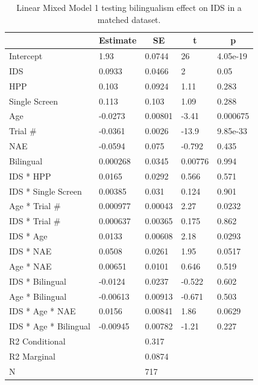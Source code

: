\documentclass[,man,floatsintext]{apa6}
\begin{document}
\begin{table}[tbp]
\begin{center}
\begin{threeparttable}
\caption{\label{tab:unnamed-chunk-10}Linear Mixed Model 1 testing bilingualism effect on IDS in a matched dataset.}
\begin{tabular}{lllll}
\toprule
 & \multicolumn{1}{c}{Estimate} & \multicolumn{1}{c}{SE} & \multicolumn{1}{c}{t} & \multicolumn{1}{c}{p}\\
\midrule
Intercept & 1.93 & 0.0744 & 26 & 4.05e-19\\
IDS & 0.0933 & 0.0466 & 2 & 0.05\\
HPP & 0.103 & 0.0924 & 1.11 & 0.283\\
Single Screen & 0.113 & 0.103 & 1.09 & 0.288\\
Age & -0.0273 & 0.00801 & -3.41 & 0.000675\\
Trial \# & -0.0361 & 0.0026 & -13.9 & 9.85e-33\\
NAE & -0.0594 & 0.075 & -0.792 & 0.435\\
Bilingual & 0.000268 & 0.0345 & 0.00776 & 0.994\\
IDS * HPP & 0.0165 & 0.0292 & 0.566 & 0.571\\
IDS * Single Screen & 0.00385 & 0.031 & 0.124 & 0.901\\
Age * Trial \# & 0.000977 & 0.00043 & 2.27 & 0.0232\\
IDS * Trial \# & 0.000637 & 0.00365 & 0.175 & 0.862\\
IDS * Age & 0.0133 & 0.00608 & 2.18 & 0.0293\\
IDS * NAE & 0.0508 & 0.0261 & 1.95 & 0.0517\\
Age * NAE & 0.00651 & 0.0101 & 0.646 & 0.519\\
IDS * Bilingual & -0.0124 & 0.0237 & -0.522 & 0.602\\
Age * Bilingual & -0.00613 & 0.00913 & -0.671 & 0.503\\
IDS * Age * NAE & 0.0156 & 0.00841 & 1.86 & 0.0629\\
IDS * Age * Bilingual & -0.00945 & 0.00782 & -1.21 & 0.227\\ \midrule
R2 Conditional &  & 0.317 &  & \\
R2 Marginal &  & 0.0874 &  & \\ \midrule
N &  & 717 &  & \\
\bottomrule
\end{tabular}
\end{threeparttable}
\end{center}
\end{table}
\end{document}
